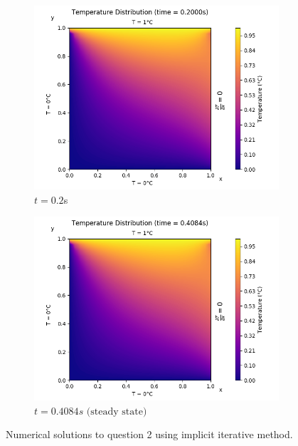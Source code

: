 \documentclass[a4paper]{article}
\begin{document}
\begin{figure}[H]
		\medskip
		\begin{subfigure}{0.48\textwidth}
			\includegraphics[width=\linewidth]{figures/2/5)t=200ms.png}
			\caption{$t = 0.2$s}
		\end{subfigure}\hspace*{\fill}
		\begin{subfigure}{0.48\textwidth}
			\includegraphics[width=\linewidth]{figures/2/6)t=408ms(ss).png}
			\caption{$t = 0.4084s \text{ (steady state)}$}
			\label{solution_2_ss}
		\end{subfigure}
		
		\caption{Numerical solutions to question 2 using implicit iterative method.} \label{solution_2}
	\end{figure}
	
\end{document}
